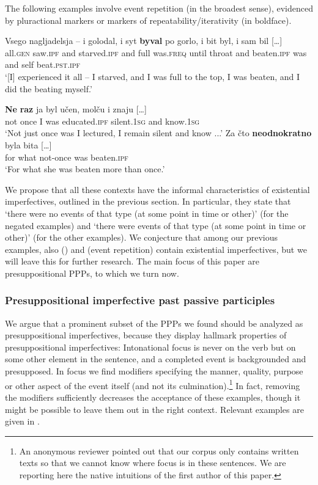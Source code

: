 \documentclass[output=paper,modfonts,newtxmath,hidelinks
\ChapterDOI{10.5281/zenodo.2545513}
]{langscibook}
\begin{document}
\noindent The following examples involve event repetition (in the broadest sense), evidenced by pluractional markers  or markers of repeatability/iterativity  (in boldface).

\ea\gll	Vsego nagljadelsja -- i golodal, i syt \textbf{byval} po gorlo, i bit byl, i sam bil [\dots] \label{golodal}\\
	all.\textsc{gen} saw.\textsc{ipf} {} and starved.\textsc{ipf} and full was.\textsc{freq} until throat and beaten.\textsc{ipf} was and self beat.\textsc{pst}.\textsc{ipf}\\
\glt	`[I] experienced it all -- I starved, and I was full to the top, I was beaten, and I did the beating myself.'\label{bit} 
\z

\ea\label{neraz}
\ea\gll	\textbf{Ne} \textbf{raz} ja byl učen, molču i znaju [\dots]\\ 
	not once I was educated.\textsc{ipf} silent.\textsc{1sg} and know.\textsc{1sg}\\
\glt	`Not just once was I lectured, I remain silent and know ...'
\ex\gll	Za čto \textbf{neodnokratno} byla bita [\dots]\\
	for what not-once was beaten.\textsc{ipf}\\
\glt	`For what she was beaten more than once.'
\z\z
	
\noindent We propose that all these contexts have the informal characteristics of existential imperfectives, outlined in the previous section. In particular, they state that `there were no events of that type (at some point in time or other)' (for the negated examples) and `there were events of that type (at some point in time or other)' (for the other examples). We conjecture that among our previous examples, also  () and  (event repetition) contain existential imperfectives, but we will leave this for further research. The main focus of this paper are presuppositional  PPPs, to which we turn now.

\subsubsection{Presuppositional imperfective past passive participles}

We argue that a prominent subset of the  PPPs we found should be analyzed as presuppositional imperfectives, because they display hallmark properties of presuppositional imperfectives: Intonational focus is never on the verb but on some other element in the sentence, and a completed event is backgrounded and presupposed. In focus we find modifiers specifying the manner, quality, purpose or other aspect of the event itself (and not its culmination).\footnote{An anonymous reviewer pointed out that our corpus only contains written texts so that we cannot know where focus is in these sentences. We are reporting here the native  intuitions of the first author of this paper.} In fact, removing the modifiers sufficiently decreases the acceptance of these examples, though it might be possible to leave them out in the right context. Relevant examples are given in .  
\end{document}
